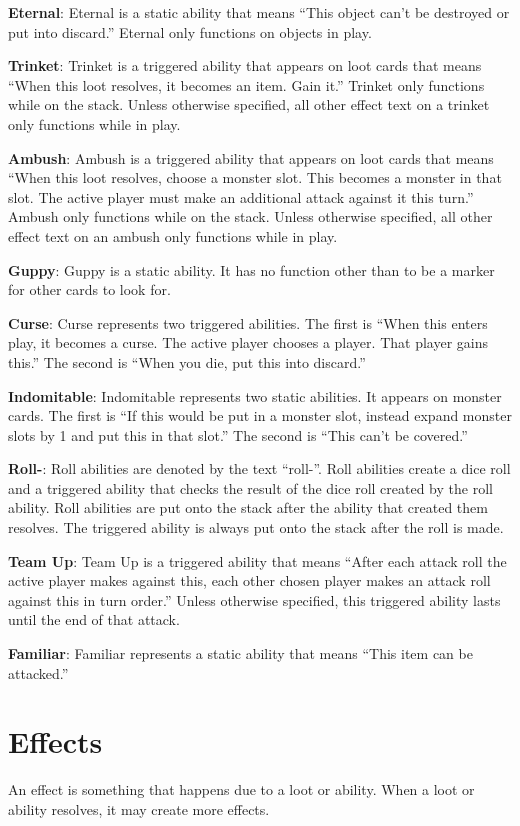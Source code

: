 \documentclass[
  fontsize=10pt,
  paper=a5,
  version=last,
  chapterprefix=true,
  bindingoffset=5mm,
  ]{scrbook}
\begin{document}
    \textbf{Eternal}: Eternal is a static ability that means “This object can’t be destroyed or put into discard.” Eternal only functions on objects in play.
    
    \textbf{Trinket}: Trinket is a triggered ability that appears on loot cards that means “When this loot resolves, it becomes an item. Gain it.” Trinket only functions while on the stack. Unless otherwise specified, all other effect text on a trinket only functions while in play.
    
    \textbf{Ambush}: Ambush is a triggered ability that appears on loot cards that means “When this loot resolves, choose a monster slot. This becomes a monster in that slot. The active player must make an additional attack against it this turn.” Ambush only functions while on the stack. Unless otherwise specified, all other effect text on an ambush only functions while in play.
    
    \textbf{Guppy}: Guppy is a static ability. It has no function other than to be a marker for other cards to look for.
    
    \textbf{Curse}: Curse represents two triggered abilities. The first is “When this enters play, it becomes a curse. The active player chooses a player. That player gains this.” The second is “When you die, put this into discard.”
    
    \textbf{Indomitable}: Indomitable represents two static abilities. It appears on monster cards. The first is “If this would be put in a monster slot, instead expand monster slots by 1 and put this in that slot.” The second is “This can’t be covered.”
    
    \textbf{Roll-}: Roll abilities are denoted by the text “roll-”. Roll abilities create a dice roll and a triggered ability that checks the result of the dice roll created by the roll ability. Roll abilities are put onto the stack after the ability that created them resolves. The triggered ability is always put onto the stack after the roll is made.
    
    \textbf{Team Up}: Team Up is a triggered ability that means “After each attack roll the active player makes against this, each other chosen player makes an attack roll against this in turn order.” Unless otherwise specified, this triggered ability lasts until the end of that attack.
    
    \textbf{Familiar}: Familiar represents a static ability that means “This item can be attacked.”

    \chapter{Effects}
    \label{effects}
    An effect is something that happens due to a loot or ability. When a loot or ability resolves, it may create more effects.
    
\end{document}
